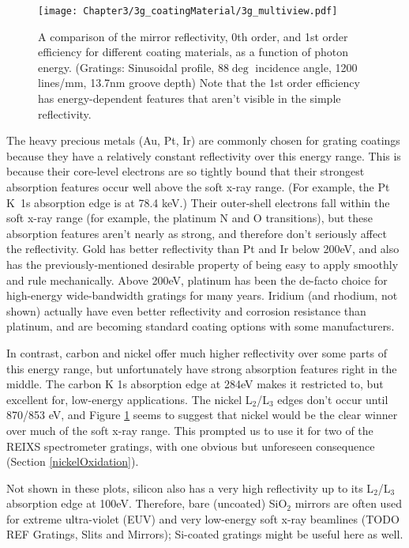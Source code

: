 \begin{figure}[htbp] %
   \centering
   \texttt{[image: Chapter3/3g\_coatingMaterial/3g\_multiview.pdf]} 
   \caption{A comparison of the mirror reflectivity, 0th order, and 1st order efficiency for different coating materials, as a function of photon energy.  (Gratings: Sinusoidal profile, 88$\deg$ incidence angle, 1200 lines/mm, 13.7nm groove depth)  Note that the 1st order efficiency has energy-dependent features that aren't visible in the simple reflectivity.}
   \label{3g-2}
\end{figure}

The heavy precious metals (Au, Pt, Ir) are commonly chosen for grating coatings because they have a relatively constant reflectivity over this energy range.  This is because their core-level electrons are so tightly bound that their strongest absorption features occur well above the soft x-ray range.  (For example, the Pt K~1s absorption edge is at 78.4 keV.)  Their outer-shell electrons fall within the soft x-ray range (for example, the platinum N and O transitions), but these absorption features aren't nearly as strong, and therefore don't seriously affect the reflectivity.  Gold has better reflectivity than Pt and Ir below 200eV, and also has the previously-mentioned desirable property of being easy to apply smoothly and rule mechanically.  Above 200eV, platinum has been the de-facto choice for high-energy wide-bandwidth gratings for many years.  Iridium (and rhodium, not shown) actually have even better reflectivity and corrosion resistance than platinum, and are becoming standard coating options with some manufacturers.

In contrast, carbon and nickel offer much higher reflectivity over some parts of this energy range, but unfortunately have strong absorption features right in the middle.  The carbon K 1s absorption edge at 284eV makes it restricted to, but excellent for, low-energy applications.  The nickel L$_2$/L$_3$ edges don't occur until 870/853 eV, and Figure \ref{3g-2} seems to suggest that nickel would be the clear winner over much of the soft x-ray range.  This prompted us to use it for two of the REIXS spectrometer gratings, with one obvious but unforeseen consequence (Section \ref{nickelOxidation}).

Not shown in these plots, silicon also has a very high reflectivity up to its L$_2$/L$_3$ absorption edge at 100eV. Therefore, bare (uncoated) SiO$_2$ mirrors are often used for extreme ultra-violet (EUV) and very low-energy soft x-ray beamlines (TODO REF Gratings, Slits and Mirrors); Si-coated gratings might be useful here as well.

